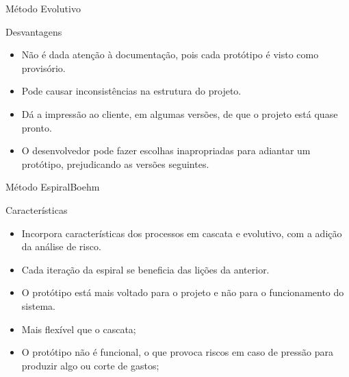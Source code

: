 \begin{frame}{Método Evolutivo}

\begin{block}{Desvantagens}
  \begin{itemize}[<+-| alert@+>]

    \item Não é dada atenção à documentação, pois cada protótipo é
      visto como provisório.

  \item Pode causar inconsistências na estrutura do projeto.

    \item Dá a impressão ao cliente, em algumas versões, de que o
      projeto está quase pronto.

    \item O desenvolvedor pode fazer escolhas inapropriadas para
      adiantar um protótipo, prejudicando as versões seguintes.
  \end{itemize}
\end{block}

\end{frame}


\begin{frame}{Método Espiral}{Boehm}
  
  \begin{block}{Características}
    \begin{itemize}[<+-| alert@+>]
    \item Incorpora características dos processos em cascata e
      evolutivo, com a adição da análise de risco.
    \item Cada iteração da espiral se beneficia das lições da anterior.
    \item O protótipo está mais voltado para o projeto e não para o
      funcionamento do sistema.
      \item Mais flexível que o cascata;
      \item O protótipo não é funcional, o que provoca riscos em caso
        de pressão para produzir algo ou corte de gastos;
    \end{itemize}
  \end{block}
\end{frame}


